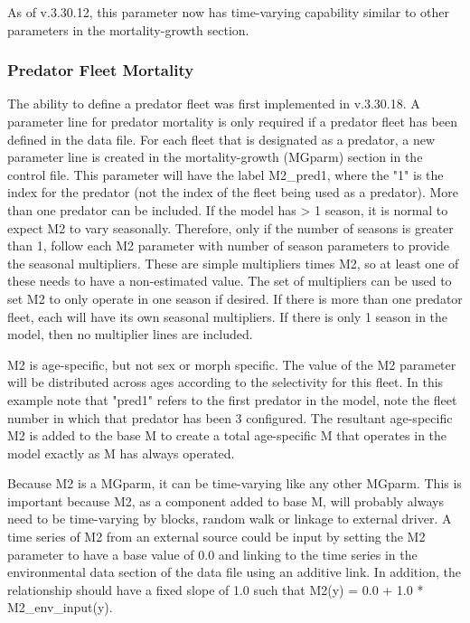 As of v.3.30.12, this parameter now has time-varying capability similar to other parameters in the mortality-growth section.

\subsubsection{Predator Fleet Mortality}
The ability to define a predator fleet was first implemented in v.3.30.18.  A parameter line for predator mortality is only required if a predator fleet has been defined in the data file. For each fleet that is designated as a predator, a new parameter line is created in the mortality-growth (MGparm) section in the control file. This parameter will have the label M2\_pred1, where the "1" is the index for the predator (not the index of the fleet being used as a predator). More than one predator can be included. If the model has > 1 season, it is normal to expect M2 to vary seasonally. Therefore, only if the number of seasons is greater than 1, follow each M2 parameter with number of season parameters to provide the seasonal multipliers. These are simple multipliers times M2, so at least one of these needs to have a non-estimated value. The set of multipliers can be used to set M2 to only operate in one season if desired. If there is more than one predator fleet, each will have its own seasonal multipliers. If there is only 1 season in the model, then no multiplier lines are included. 

M2 is age-specific, but not sex or morph specific. The value of the M2 parameter will be distributed across ages according to the selectivity for this fleet. In this example note that "pred1" refers to the first predator in the model, note the fleet number in which that predator has been 3 configured. The resultant age-specific M2 is added to the base M to create a total age-specific M that operates in the model exactly as M has always operated. 

Because M2 is a MGparm, it can be time-varying like any other MGparm. This is important because M2, as a component added to base M, will probably always need to be time-varying by blocks, random walk or linkage to external driver. A time series of M2 from an external source could be input by setting the M2 parameter to have a base value of 0.0 and linking to the time series in the environmental data section of the data file using an additive link. In addition, the relationship should have a fixed slope of 1.0 such that M2(y) = 0.0 + 1.0 * M2\_env\_input(y). 

